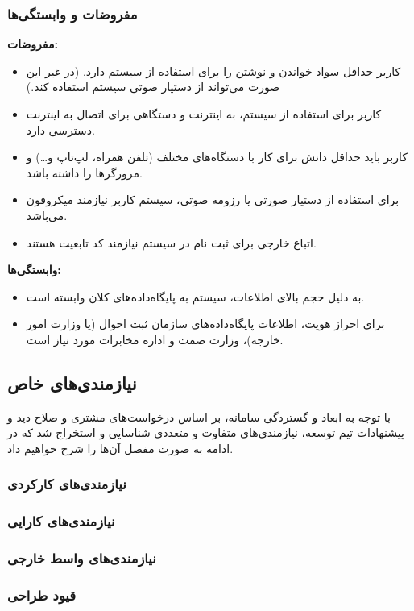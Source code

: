 \documentclass[12pt]{article}
\begin{document}
	\subsubsection{مفروضات و وابستگی‌ها}
	\textbf{مفروضات:}
	\begin{itemize}
		\item
		کاربر حداقل سواد خواندن و نوشتن را برای استفاده از سیستم دارد. (در غیر این صورت می‌تواند از دستیار صوتی سیستم استفاده کند.)
		\item
		کاربر برای استفاده از سیستم، به اینترنت و دستگاهی برای اتصال به اینترنت دسترسی دارد.
		\item
		کاربر باید حداقل دانش برای کار با دستگاه‌های مختلف (تلفن همراه، لپ‌تاپ و…) و مرورگرها را داشته باشد.
		\item
		برای استفاده از دستیار صورتی یا رزومه صوتی، سیستم کاربر نیازمند میکروفون می‌باشد.
		\item
		اتباع خارجی برای ثبت نام در سیستم نیازمند کد تابعیت هستند.
	\end{itemize}
	\textbf{وابستگی‌ها:}
	\begin{itemize}
		\item
		به دلیل حجم بالای اطلاعات، سیستم به پایگاه‌داده‌های کلان وابسته است.
		\item
		برای احراز هویت، اطلاعات پایگاه‌داده‌های سازمان ثبت احوال (یا وزارت امور خارجه)، وزارت صمت و اداره مخابرات مورد‌ نیاز است.
	\end{itemize}

	\newpage

	\subsection{نیازمندی‌های خاص}
	با توجه به ابعاد و گستردگی سامانه، بر اساس درخواست‌های مشتری و صلاح دید و پیشنهادات تیم توسعه، نیازمندی‌های متفاوت و متعددی شناسایی و استخراج شد که در ادامه به صورت مفصل آن‌ها را شرح خواهیم داد.

	\subsubsection{نیازمندی‌های کارکردی}
	\subsubsection{نیازمندی‌های کارایی}
	\subsubsection{نیازمندی‌های واسط خارجی}
	\subsubsection{قیود طراحی}
\end{document}
